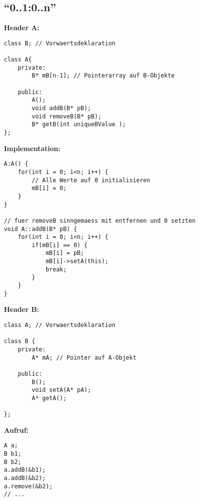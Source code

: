 \newpage

\subsection{"`0..1:0..n"'}
\begin{multicols}{2}
\textbf{Header A:}
\begin{lstlisting}
class B; // Vorwaertsdeklaration

class A{
	private:
		B* mB[n-1]; // Pointerarray auf B-Objekte
	
	public:
	    A();
		void addB(B* pB);
		void removeB(B* pB);
		B* getB(int uniqueBValue );
};
\end{lstlisting}

\textbf{Implementation:}
\begin{lstlisting}
A:A() {
	for(int i = 0; i<n; i++) {
		// Alle Werte auf 0 initialisieren
		mB[i] = 0; 
	}
}

// fuer removeB sinngemaess mit entfernen und 0 setzten
void A::addB(B* pB) {
	for(int i = 0; i<n; i++) {
		if(mB[i] == 0) {
			mB[i] = pB;
			mB[i]->setA(this);
			break;
		}
	}
}
\end{lstlisting}

\columnbreak

\textbf{Header B:}
\begin{lstlisting}
class A; // Vorwaertsdeklaration

class B {
	private: 
		A* mA; // Pointer auf A-Objekt
		
	public:
		B();
		void setA(A* pA);
		A* getA();
		
};
\end{lstlisting}

\textbf{Aufruf:}
\begin{lstlisting}
A a;
B b1;
B b2;
a.addB(&b1);
a.addB(&b2);
a.remove(&b2);
// ...
\end{lstlisting}
\end{multicols}





